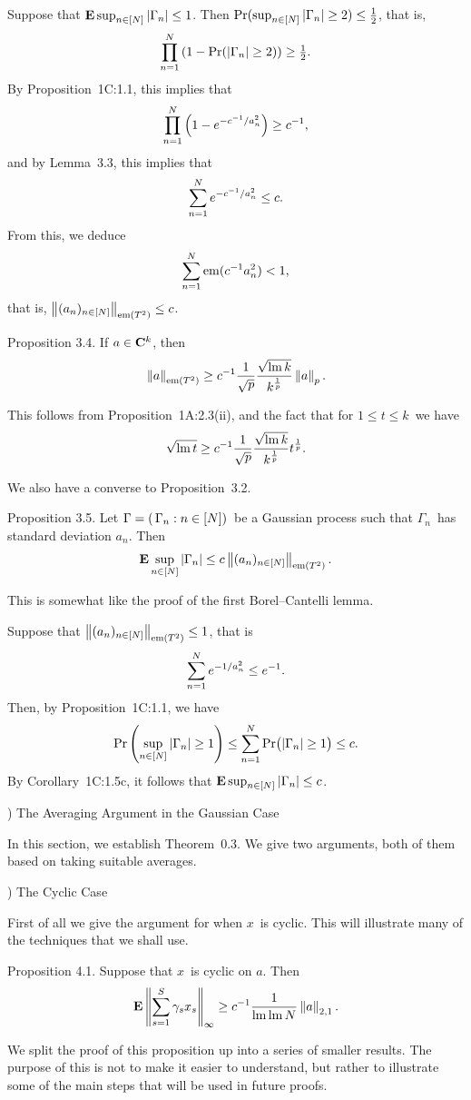 Suppose that ${\bf E}\sup_{n\in[N]} | \Gamma_n | \le 1$. Then $\mathop{\rm Pr}\nolimits(\sup_{n\in[N]} | \Gamma_n | \ge 2) \le
{1\over2}$, that
is,
$$ \prod_{n=1}^N \left(1-\mathop{\rm Pr}\nolimits(\left|\Gamma_n\right| \ge 2) \right) \ge {\textstyle{{1\over2}}}
.$$
By Proposition~1C:1.1, this implies that
$$ \prod_{n=1}^N \left(1-e^{-c^{-1}/a_n^2}\right) \ge c^{-1} ,$$
and by Lemma~3.3, this implies that
$$ \sum_{n=1}^N e^{-c^{-1}/a_n^2} \le c .$$
From this, we deduce
$$ \sum_{n=1}^N \mathop{\rm em}\nolimits(c^{-1} a_n^2) < 1 ,$$
that is, $\left\| (a_n)_{n\in[N]} \right\|_{\mathop{\rm em}\nolimits(T^2)} \le c $.
\endproof
 
\proclaim Proposition 3.4. If $a\in{\bf C}^k$, then
$$ \left\| a \right\|_{\mathop{\rm em}\nolimits(T^2)} \ge c^{-1} {1\over\sqrt{p}} {\sqrt{\mathop{\rm lm}\nolimits k} \over
   k^{1\over p}} \left\| a \right\|_p .$$
 
\Proof This follows from Proposition~1A:2.3(ii), and the fact that
for $1\le
t\le k$\ we have
$$ \sqrt{\mathop{\rm lm}\nolimits t} \ge c^{-1} {1\over\sqrt{p}} {\sqrt{\mathop{\rm lm}\nolimits k} \over k^{1\over p}} t^{1\over p}
.$$
\endproof
 
We also have a converse to Proposition~3.2.
 
\proclaim Proposition 3.5. Let $\Gamma=(\,\Gamma_n:n\in[N])$\ be a
Gaussian process such that $\Gamma_n$\ has standard deviation $a_n$.
Then
$$ {\bf E} \sup_{n\in[N]} | \Gamma_n | \le c \left\| (a_n)_{n\in[N]} \right\|_{\mathop{\rm em}\nolimits(T^2)}. $$
 
\Proof This is somewhat like the proof of the first Borel--Cantelli
lemma.
 
Suppose that $\left\| (a_n)_{n\in[N]} \right\|_{\mathop{\rm em}\nolimits(T^2)} \le 1$, that is
$$ \sum_{n=1}^N e^{-1/a_n^2} \le e^{-1} .$$
Then, by Proposition~1C:1.1, we have
$$ \mathop{\rm Pr}\nolimits \left( \sup_{n\in[N]} | \Gamma_n | \ge 1 \right)
   \le \sum_{n=1}^N \mathop{\rm Pr}\nolimits \bigl(\left|\Gamma_n\right| \ge 1\bigr)
   \le c .$$
By Corollary~1C:1.5c, it follows that ${\bf E}\sup_{n\in[N]} | \Gamma_n | \le c$.
\endproof
 
\vfill
\eject
 
) The Averaging Argument in the Gaussian Case
 
In this section, we establish Theorem~0.3.
We give two arguments, both of them
based on taking suitable averages.
 
) The Cyclic Case
 
First of all we give the argument for when $x$\ is cyclic. This will
illustrate many of the techniques that we shall use.
 
\proclaim Proposition 4.1. Suppose that $x$\ is cyclic on $a$.
Then
$$ {\bf E} \left\| \sum_{s=1}^S \gamma_s x_s \right\|_\infty \ge c^{-1} {1\over \mathop{\rm lm}\nolimits\mathop{\rm lm}\nolimits N} \left\| a \right\|_{2,1} .$$
 
We split the proof of this proposition
up into a series of smaller results. The
purpose of this is not to make it easier to understand, but rather to
illustrate some of the main steps that will be used in future proofs.
 

